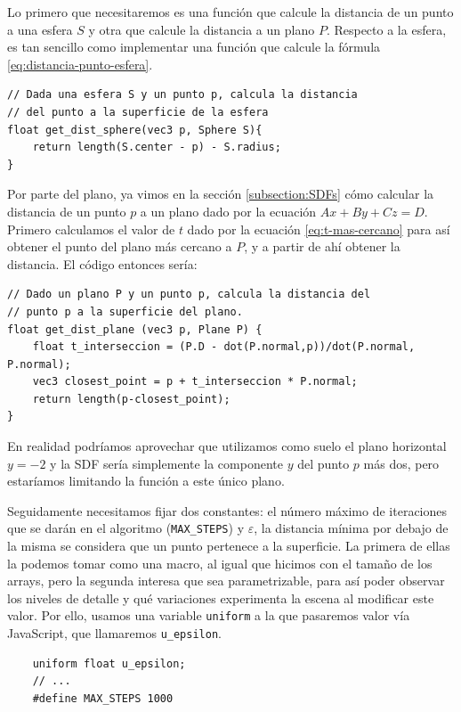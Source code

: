 Lo primero que necesitaremos es una función que calcule la distancia de un punto a una esfera $S$ y otra que calcule la distancia a un plano $P$. Respecto a la esfera, es tan sencillo como implementar una función que calcule la fórmula \ref{eq:distancia-punto-esfera}.

\begin{lstlisting}
// Dada una esfera S y un punto p, calcula la distancia
// del punto a la superficie de la esfera
float get_dist_sphere(vec3 p, Sphere S){
    return length(S.center - p) - S.radius;
}
\end{lstlisting}

Por parte del plano, ya vimos en la sección \ref{subsection:SDFs} cómo calcular la distancia de un punto $p$ a un plano dado por la ecuación $Ax+By+Cz=D$. Primero calculamos el valor de $t$ dado por la ecuación \ref{eq:t-mas-cercano} para así obtener el punto del plano más cercano a $P$, y a partir de ahí obtener la distancia. El código entonces sería:

\begin{lstlisting}
// Dado un plano P y un punto p, calcula la distancia del 
// punto p a la superficie del plano.
float get_dist_plane (vec3 p, Plane P) {
    float t_interseccion = (P.D - dot(P.normal,p))/dot(P.normal, P.normal);
    vec3 closest_point = p + t_interseccion * P.normal;
    return length(p-closest_point);
}
\end{lstlisting}

En realidad podríamos aprovechar que utilizamos como suelo el plano horizontal $y=-2$ y la SDF sería simplemente la componente $y$ del punto $p$ más dos, pero estaríamos limitando la función a este único plano.

Seguidamente necesitamos fijar dos constantes: el número máximo de iteraciones que se darán en el algoritmo (\texttt{MAX\_STEPS}) y $\varepsilon$, la distancia mínima por debajo de la misma se considera que un punto pertenece a la superficie. La primera de ellas la podemos tomar como una macro, al igual que hicimos con el tamaño de los arrays, pero la segunda interesa que sea parametrizable, para así poder observar los niveles de detalle y qué variaciones experimenta la escena al modificar este valor. Por ello, usamos una variable \verb|uniform| a la que pasaremos valor vía JavaScript, que llamaremos \texttt{u\_epsilon}.

\begin{lstlisting}
    uniform float u_epsilon;
    // ... 
    #define MAX_STEPS 1000
\end{lstlisting}

